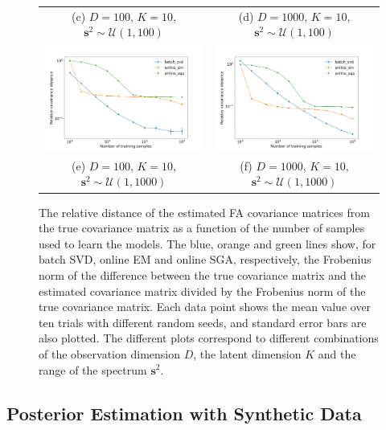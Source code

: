 \documentclass[msc,deptreport.inf]{infthesis} %
\newcommand{\matr}[1]{\mathbf{#1}}
\begin{document}
\begin{figure}[!htbp]
\begin{tabular}{cc}
		 (c) $D=100$, $K=10$, $\matr{s}^2 \sim \mathcal{U}(1, 100)$ 
		 & (d) $D=1000$, $K=10$, $\matr{s}^2 \sim \mathcal{U}(1, 100)$\\[6pt]
		 \includegraphics[width=70mm]{plots/online_fa_covar_distance__observation_dim=100__latent_dim=10__spectrum_min=1__spectrum_max=1000.png}
		 & \includegraphics[width=70mm]{plots/online_fa_covar_distance__observation_dim=1000__latent_dim=10__spectrum_min=1__spectrum_max=1000.png} \\
		 (e) $D=100$, $K=10$, $\matr{s}^2 \sim \mathcal{U}(1, 1000)$ 
		 & (f) $D=1000$, $K=10$, $\matr{s}^2 \sim \mathcal{U}(1, 1000)$\\[6pt]
	\end{tabular}
	\caption{The relative distance of the estimated FA covariance matrices from the true covariance matrix as a function of the number of samples used to learn the models. The blue, orange and green lines show, for batch SVD, online EM and online SGA, respectively, the Frobenius norm of the difference between the true covariance matrix and the estimated covariance matrix divided by the Frobenius norm of the true covariance matrix. Each data point shows the mean value over ten trials with different random seeds, and standard error bars are also plotted. The different plots correspond to different combinations of the observation dimension $D$, the latent dimension $K$ and the range of the spectrum $\matr{s}^2$.} 
	\label{fig:fa_covar_distance}
\end{figure}

\subsection{Posterior Estimation with Synthetic Data}\label{sec:online_fa_posterior_experiments}
\end{document}
